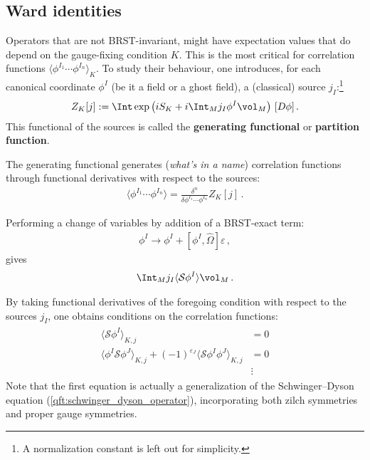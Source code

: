 \subsection{Ward identities}

    Operators that are not BRST-invariant, might have expectation values that do depend on the gauge-fixing condition $K$. This is the most critical for correlation functions $\langle\phi^{I_1}\cdots\phi^{I_n}\rangle_K$. To study their behaviour, one introduces, for each canonical coordinate $\phi^I$ (be it a field or a ghost field), a (classical) source $j_I$:\footnote{A normalization constant is left out for simplicity.}
    \begin{gather}
        \label{qft:partition_function}
        Z_K[j] := \Int\exp\left(iS_K + i\Int_Mj_I\phi^I\vol_M\right)\,[D\phi]\,.
    \end{gather}
    This functional of the sources is called the \textbf{generating functional} or \textbf{partition function}.
    
    \begin{property}\label{qft:diagram_generation}
        The generating functional generates (\textit{what's in a name}) correlation functions through functional derivatives with respect to the sources:
        \begin{gather}
            \langle\phi^{I_1}\cdots\phi^{I_n}\rangle = \frac{\delta^n}{\delta\phi^{I_1}\cdots\phi^{I_n}}Z_K[j]\,.
        \end{gather}
    \end{property}

    Performing a change of variables by addition of a BRST-exact term:
    \begin{gather}
        \phi^I \longrightarrow \phi^I+[\phi^I,\widehat{\Omega}]\varepsilon\,,
    \end{gather}
    gives
    \begin{gather}
        \label{qft:pre_ward_equation}
        \Int_Mj_I\langle\mathcal{S}\phi^I\rangle\vol_M\,.
    \end{gather}
    \begin{property}
        By taking functional derivatives of the foregoing condition with respect to the sources $j_I$, one obtains conditions on the correlation functions:
        \begin{gather}
            \begin{aligned}
                \langle\mathcal{S}\phi^I\rangle_{K,j} &= 0\\
                \langle\phi^I\mathcal{S}\phi^J\rangle_{K,j} + (-1)^{\varepsilon_J}\langle\mathcal{S}\phi^I\phi^J\rangle_{K,j} &= 0\\
                &\vdots
            \end{aligned}
        \end{gather}
        Note that the first equation is actually a generalization of the Schwinger--Dyson equation (\cref{qft:schwinger_dyson_operator}), incorporating both zilch symmetries and proper gauge symmetries.
    \end{property}

